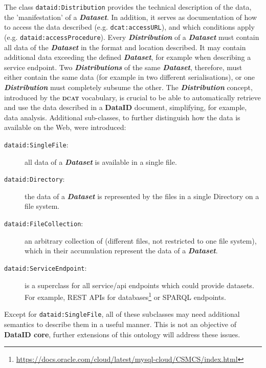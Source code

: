 \documentclass[a4paper,english,twoside,BCOR1.5cm,headsepline,DIV12,appendixprefix,final,12pt]{scrbook}
\newcommand{\dataid}{{\ttfamily\bfseries DataID}\xspace}
\newcommand{\core}{{\ttfamily\bfseries DataID core}\xspace}
\newcommand{\dcat}{{\scshape\bfseries dcat}\xspace}
\newcommand{\prop}[1]{{{\texttt{#1}}}}
\newcommand{\important}[1]{\textbf{\textit{#1}}}
\newcommand\footnoteurl[1]{\footnote{\scriptsize\url{#1}}}
\begin{document}
The class \prop{dataid:Distribution} provides the technical description of the data, the 'manifestation' of a \important{Dataset}. In addition, it serves as documentation of how to access the data described (e.g. \prop{dcat:accessURL}), and which conditions apply (e.g. \prop{dataid:accessProcedure}). Every \important{Distribution} of a \important{Dataset} must contain all data of the \important{Dataset} in the format and location described. It may contain additional data exceeding the defined \important{Dataset}, for example when describing a service endpoint. Two \important{Distributions} of the same \important{Dataset}, therefore, must either contain the same data (for example in two different serialisations), or one \important{Distribution} must completely subsume the other. The \important{Distribution} concept, introduced by the \dcat vocabulary, is crucial to be able to automatically retrieve and use the data described in a \dataid document, simplifying, for example, data analysis. Additional sub-classes, to further distinguish how the data is available on the Web, were introduced:

\begin{description}
\item[\prop{dataid:SingleFile}:] all data of a \important{Dataset} is available in a single file.
\item[\prop{dataid:Directory}:] the data of a \important{Dataset} is represented by the files in a single Directory on a file system.
\item[\prop{dataid:FileCollection}:] an arbitrary collection of (different files, not restricted to one file system), which in their accumulation represent the data of a \important{Dataset}.
\item[\prop{dataid:ServiceEndpoint}:] is a superclass for all service/api endpoints which could provide datasets. For example, REST APIs for databases\footnoteurl{https://docs.oracle.com/cloud/latest/mysql-cloud/CSMCS/index.html} or SPARQL endpoints.
\end{description}

Except for \prop{dataid:SingleFile}, all of these subclasses may need additional semantics to describe them in a useful manner. This is not an objective of \core, further extensions of this ontology will address these issues.
\end{document}
